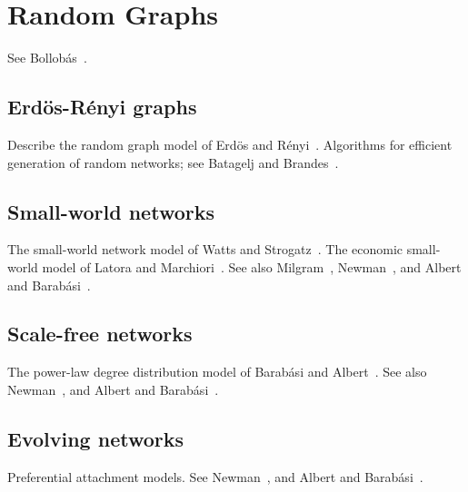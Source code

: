 
\chapter{Random Graphs}
\label{chap:random_graphs}

See Bollob{\'a}s~\cite{Bollobas2001}.



\section{Erd{\"o}s-R{\'e}nyi graphs}

Describe the random graph model of Erd{\"o}s and
R{\'e}nyi~\cite{ErdosRenyi1959}. Algorithms for efficient generation
of random networks; see Batagelj and
Brandes~\cite{BatageljBrandes2005}.



\section{Small-world networks}

The small-world network model of Watts and
Strogatz~\cite{WattsStrogatz1998}. The economic small-world model of
Latora and Marchiori~\cite{LatoraMarchiori2003}. See also
Milgram~\cite{Milgram1967}, Newman~\cite{Newman2003}, and Albert and
Barab{\'a}si~\cite{AlbertBarabasi2002}.



\section{Scale-free networks}

The power-law degree distribution model of Barab{\'a}si and
Albert~\cite{BarabasiAlbert1999}. See also Newman~\cite{Newman2003},
and Albert and Barab{\'a}si~\cite{AlbertBarabasi2002}.



\section{Evolving networks}

Preferential attachment models. See Newman~\cite{Newman2003},
and Albert and Barab{\'a}si~\cite{AlbertBarabasi2002}.
